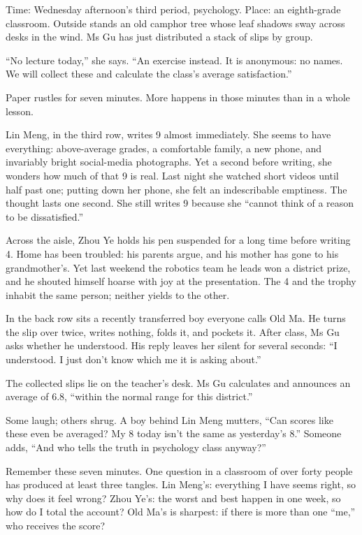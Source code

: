 Time: Wednesday afternoon's third period, psychology. Place: an eighth-grade classroom. Outside stands an old camphor tree whose leaf shadows sway across desks in the wind. Ms Gu has just distributed a stack of slips by group.

``No lecture today,'' she says. ``An exercise instead. It is anonymous: no names. We will collect these and calculate the class's average satisfaction.''

Paper rustles for seven minutes. More happens in those minutes than in a whole lesson.

Lin Meng, in the third row, writes 9 almost immediately. She seems to have everything: above-average grades, a comfortable family, a new phone, and invariably bright social-media photographs. Yet a second before writing, she wonders how much of that 9 is real. Last night she watched short videos until half past one; putting down her phone, she felt an indescribable emptiness. The thought lasts one second. She still writes 9 because she ``cannot think of a reason to be dissatisfied.''

Across the aisle, Zhou Ye holds his pen suspended for a long time before writing 4. Home has been troubled: his parents argue, and his mother has gone to his grandmother's. Yet last weekend the robotics team he leads won a district prize, and he shouted himself hoarse with joy at the presentation. The 4 and the trophy inhabit the same person; neither yields to the other.

In the back row sits a recently transferred boy everyone calls Old Ma. He turns the slip over twice, writes nothing, folds it, and pockets it. After class, Ms Gu asks whether he understood. His reply leaves her silent for several seconds: ``I understood. I just don't know which me it is asking about.''

The collected slips lie on the teacher's desk. Ms Gu calculates and announces an average of 6.8, ``within the normal range for this district.''

Some laugh; others shrug. A boy behind Lin Meng mutters, ``Can scores like these even be averaged? My 8 today isn't the same as yesterday's 8.'' Someone adds, ``And who tells the truth in psychology class anyway?''

Remember these seven minutes. One question in a classroom of over forty people has produced at least three tangles. Lin Meng's: everything I have seems right, so why does it feel wrong? Zhou Ye's: the worst and best happen in one week, so how do I total the account? Old Ma's is sharpest: if there is more than one ``me,'' who receives the score?

